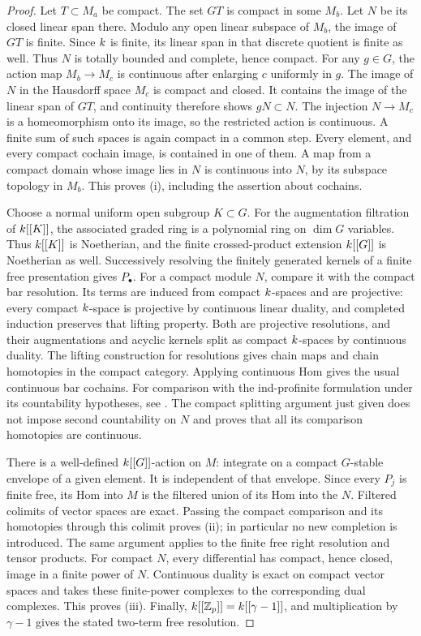 \begin{proof}
Let $T\subset M_a$ be compact.  The set $GT$ is compact in some $M_b$.
Let $N$ be its closed linear span there.  Modulo any open linear
subspace of $M_b$, the image of $GT$ is finite.  Since $k$ is finite,
its linear span in that discrete quotient is finite as well.  Thus
$N$ is totally bounded and complete, hence compact.  For any $g\in G$,
the action map $M_b\to M_c$ is continuous after enlarging $c$ uniformly
in $g$.  The image of $N$ in the Hausdorff space $M_c$ is compact and
closed.  It contains the image of the linear span of $GT$, and
continuity therefore shows $gN\subset N$.  The injection $N\to M_c$
is a homeomorphism onto its image, so the restricted action is
continuous.  A finite sum of such spaces is again compact in a common
step.  Every element, and every compact cochain image, is contained in
one of them.  A map from a compact domain whose image lies in $N$ is
continuous into $N$, by its subspace topology in $M_b$.  This proves
(i), including the assertion about cochains.

Choose a normal uniform open subgroup $K\subset G$.  For the
augmentation filtration of $k[[K]]$, the associated graded ring is
a polynomial ring on $\dim G$ variables.  Thus $k[[K]]$ is
Noetherian, and the finite crossed-product extension $k[[G]]$ is
Noetherian as well.  Successively resolving the finitely generated
kernels of a finite free presentation gives $P_\bullet$.  For a
compact module $N$, compare it with the compact bar resolution.
Its terms are induced from compact $k$-spaces and are projective:
every compact $k$-space is projective by continuous linear duality,
and completed induction preserves that lifting property.
Both are projective resolutions, and their augmentations and
acyclic kernels split as compact $k$-spaces by continuous duality.
The lifting construction for resolutions gives chain maps and chain
homotopies in the compact category.  Applying continuous Hom gives
the usual continuous bar cochains.  For comparison with the
ind-profinite formulation under its countability hypotheses, see
\citet[Proposition~8.2 and Corollary~8.4]{boggiCorobCook}.
The compact splitting argument just given does not impose
second countability on $N$ and proves that all its comparison
homotopies are continuous.

There is a well-defined $k[[G]]$-action on $M$: integrate on a compact
$G$-stable envelope of a given element.  It is independent of that
envelope.  Since every $P_j$ is finite free, its Hom into $M$ is the
filtered union of its Hom into the $N$.  Filtered colimits of vector
spaces are exact.  Passing the compact comparison and its homotopies
through this colimit proves (ii); in particular no new completion is
introduced.  The same argument applies to the finite free right
resolution and tensor products.  For compact $N$, every differential
has compact, hence closed, image in a finite power of $N$.
Continuous duality is exact on compact vector spaces and takes these
finite-power complexes to the corresponding dual complexes.  This
proves (iii).  Finally,
$k[[\mathbb Z_p]]=k[[\gamma-1]]$, and multiplication by $\gamma-1$ gives
the stated two-term free resolution.
\end{proof}

